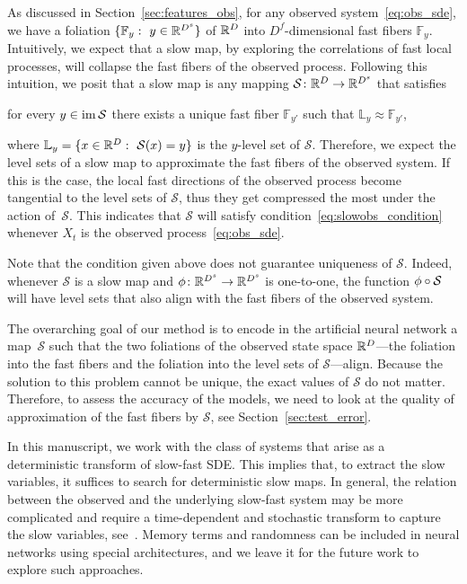 \documentclass{article}
\newcommand{\smap}{\mathcal{S}} %
\newcommand{\levs}{\mathbb{L}} %
\newcommand{\ffib}{\mathbb{F}} %
\begin{document}
As discussed in Section~\ref{sec:features_obs}, for any observed system~\eqref{eq:obs_sde}, we have a foliation $\{\ffib_y:\ y\in\R^{D^s}\}$ of $\mathbb{R}^D$ into $D^f$-dimensional fast fibers $\ffib_y$. Intuitively, we expect that a slow map, by exploring the correlations of fast local processes, will collapse the fast fibers of the observed process. Following this intuition, we posit that a slow map is any mapping $\smap\from\R^D\to\R^{D^s}$ that satisfies
\begin{center}
    for every $y\in\img\smap$ there exists a unique fast fiber $\ffib_{y'}$ such that $\levs_y \approx \ffib_{y'}$,
\end{center}
where $\levs_y = \{x\in\R^{D}:\ \smap(x)=y\}$ is the $y$-level set of $\smap$. Therefore, we expect the level sets of a slow map to approximate the fast fibers of the observed system. If this is the case, the local fast directions of the observed process become tangential to the level sets of $\smap$, thus they get compressed the most under the action of~$\smap$. This indicates that $\smap$ will satisfy condition~\eqref{eq:slowobs_condition} whenever $X_t$ is the observed process~\eqref{eq:obs_sde}.

\begin{rem}\label{rem:non-uniq}
Note that the condition given above does not guarantee uniqueness of $\smap$. Indeed, whenever $\smap$ is a slow map and $\phi\colon\mathbb{R}^{D^s}\to\mathbb{R}^{D^s}$ is one-to-one, the function $\ph\circ\smap$ will have level sets that also align with the fast fibers of the observed system.
\end{rem}

The overarching goal of our method is to encode in the artificial neural network a map~$\smap$ such that the two foliations of the observed state space $\mathbb{R}^D$---the foliation into the fast fibers and the foliation into the level sets of $\smap$---align. Because the solution to this problem cannot be unique, the exact values of $\smap$ do not matter. Therefore, to assess the accuracy of the models, we need to look at the quality of approximation of the fast fibers by $\smap$, see Section~\ref{sec:test_error}.

\begin{rem}
In this manuscript, we work with the class of systems that arise as a deterministic transform of slow-fast SDE. This implies that, to extract the slow variables, it suffices to search for deterministic slow maps. In general, the relation between the observed and the underlying slow-fast system may be more complicated and require a time-dependent and stochastic transform to capture the slow variables, see~\cite{roberts_normal_2008}. Memory terms and randomness can be included in neural networks using special architectures, and we leave it for the future work to explore such approaches.
\end{rem}
\end{document}
